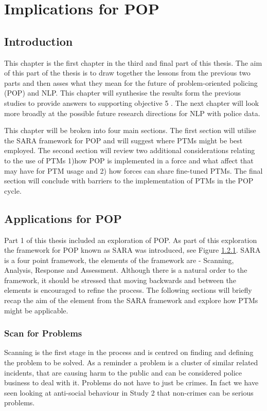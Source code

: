 \chapter{Implications for POP}


\section{Introduction} This chapter is the first chapter in the third and final part of this thesis. The aim of this part of the thesis is to draw together the lessons from the previous two parts and then asses what they mean for the future of problem-oriented policing (POP) and NLP.  This chapter will synthesise the results form the previous studies to provide answers to supporting objective 5  . The next chapter will look more broadly at the possible future research directions for NLP with police data.

This chapter will be broken into four main sections. The first section will utilise the SARA framework for POP and  will suggest where PTMs might be best employed. The second section will review two additional considerations relating to the use of PTMs 1)how POP is implemented in a force and what affect that may have for PTM usage and 2) how forces can share fine-tuned PTMs. The final section will conclude with barriers to the implementation of PTMs in the POP cycle.


\section{Applications for POP} Part 1 of this thesis included an exploration of POP. As part of this exploration the framework for POP known as SARA was introduced, see Figure \ref{}. SARA is a four point framework, the elements of the framework are - Scanning, Analysis, Response and Assessment.  Although there is a natural order to the framework, it should be stressed that moving backwards and between the elements is encouraged to refine the process.  The following sections will briefly recap the aim of the element from the SARA framework and explore how PTMs might be applicable.

\subsection{Scan for Problems} Scanning is the first stage in the process and is centred on finding and defining the problem to be solved. As a reminder a problem is a cluster of similar related incidents, that are causing harm to the public and can be considered police business to deal with it. Problems do not have to just be crimes. In fact we have seen looking at anti-social behaviour in Study 2 that non-crimes can be serious problems. 

